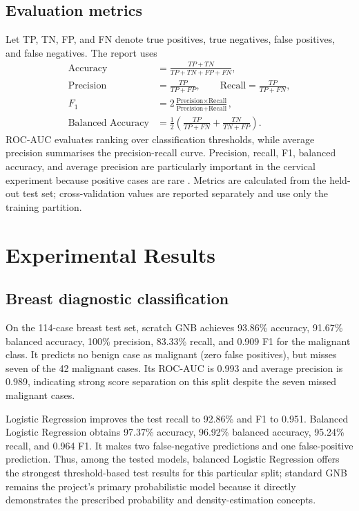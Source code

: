 \documentclass[conference]{IEEEtran}
\begin{document}
\subsection{Evaluation metrics}
Let TP, TN, FP, and FN denote true positives, true negatives, false positives, and false negatives. The report uses
\begin{align}
\text{Accuracy}&=\frac{TP+TN}{TP+TN+FP+FN},\\
\text{Precision}&=\frac{TP}{TP+FP},\qquad
\text{Recall}=\frac{TP}{TP+FN},\\
F_1&=2\frac{\text{Precision}\times\text{Recall}}{\text{Precision}+\text{Recall}},\\
\text{Balanced Accuracy}&=\frac{1}{2}\left(\frac{TP}{TP+FN}+\frac{TN}{TN+FP}\right).
\end{align}
ROC-AUC evaluates ranking over classification thresholds, while average precision summarises the precision-recall curve. Precision, recall, F1, balanced accuracy, and average precision are particularly important in the cervical experiment because positive cases are rare \cite{saito}. Metrics are calculated from the held-out test set; cross-validation values are reported separately and use only the training partition.

\section{Experimental Results}
\subsection{Breast diagnostic classification}
On the 114-case breast test set, scratch GNB achieves 93.86\% accuracy, 91.67\% balanced accuracy, 100\% precision, 83.33\% recall, and 0.909 F1 for the malignant class. It predicts no benign case as malignant (zero false positives), but misses seven of the 42 malignant cases. Its ROC-AUC is 0.993 and average precision is 0.989, indicating strong score separation on this split despite the seven missed malignant cases.

Logistic Regression improves the test recall to 92.86\% and F1 to 0.951. Balanced Logistic Regression obtains 97.37\% accuracy, 96.92\% balanced accuracy, 95.24\% recall, and 0.964 F1. It makes two false-negative predictions and one false-positive prediction. Thus, among the tested models, balanced Logistic Regression offers the strongest threshold-based test results for this particular split; standard GNB remains the project's primary probabilistic model because it directly demonstrates the prescribed probability and density-estimation concepts.
\end{document}
